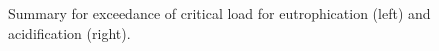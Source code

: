 \begin{figure}[ht]
  \centering
  \caption{Summary for exceedance of critical load for eutrophication (left) and acidification (right).}
\label{fig:stats_cl_ex}
\end{figure}
